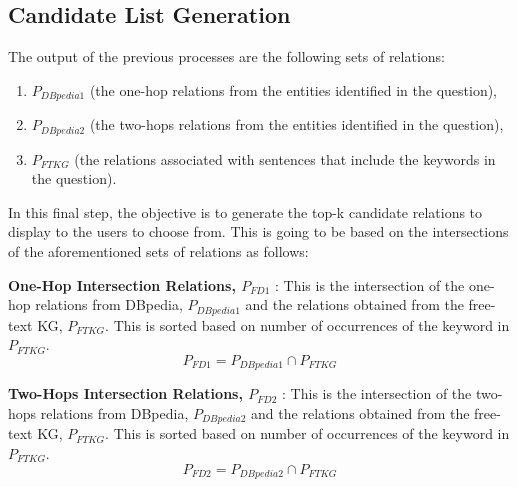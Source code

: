 \begin{sloppypar}
\subsection{Candidate List Generation}
\label{sec:candidatelist}
The output of the previous processes are the following sets of relations: 
\begin{enumerate}
    \item $P_{DBpedia1}$ (the one-hop relations from the entities identified in the question),
    \item $P_{DBpedia2}$ (the two-hops relations from the entities identified in the question), 
    \item $P_{FTKG}$ (the relations associated with sentences that include the keywords in the question).
\end{enumerate}
 In this final step, the objective is to generate the top-k candidate relations to display to the users to choose from. This is going to be based on the intersections of the aforementioned sets of relations as follows:

\textbf{One-Hop Intersection Relations, $P_{FD1}$} : This is the intersection of the one-hop relations from DBpedia, $P_{DBpedia1}$ and the relations obtained from the free-text KG, $P_{FTKG}$. This is sorted based on number of occurrences of the keyword in $P_{FTKG}$.
\begin{equation}
    P_{FD1}=P_{DBpedia1} \cap P_{FTKG}
\end{equation} 

\textbf{Two-Hops Intersection Relations, $P_{FD2}$} : This is the intersection of the two-hops relations from DBpedia, $P_{DBpedia2}$ and the relations obtained from the free-text KG, $P_{FTKG}$. This is sorted based on number of occurrences of the keyword in $P_{FTKG}$.
\begin{equation}
    P_{FD2}=P_{DBpedia2} \cap P_{FTKG}
\end{equation} 



\end{sloppypar}

